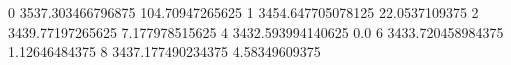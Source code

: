0 3537.303466796875 104.70947265625
1 3454.647705078125 22.0537109375
2 3439.77197265625 7.177978515625
4 3432.593994140625 0.0
6 3433.720458984375 1.12646484375
8 3437.177490234375 4.58349609375

